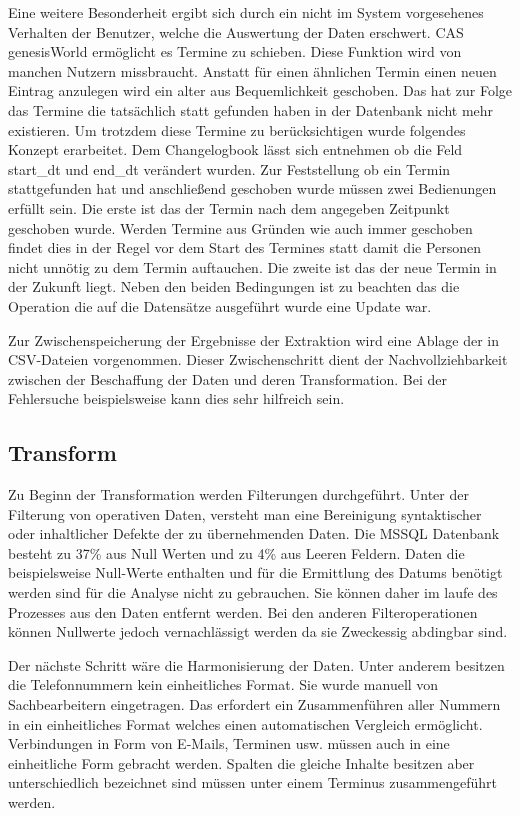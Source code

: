 Eine weitere Besonderheit ergibt sich durch ein nicht im System vorgesehenes Verhalten der Benutzer, welche die Auswertung der Daten erschwert. CAS genesisWorld ermöglicht es Termine zu schieben. Diese Funktion wird von manchen Nutzern missbraucht. Anstatt für einen ähnlichen Termin einen neuen Eintrag anzulegen wird ein alter aus Bequemlichkeit geschoben. Das hat zur Folge das Termine die tatsächlich statt gefunden haben in der Datenbank nicht mehr existieren. Um trotzdem diese Termine zu berücksichtigen wurde folgendes Konzept erarbeitet. Dem Changelogbook lässt sich entnehmen ob die Feld start\_dt und end\_dt verändert wurden. Zur Feststellung ob ein Termin stattgefunden hat und anschließend geschoben wurde müssen zwei Bedienungen erfüllt sein. Die erste ist das der Termin nach dem angegeben Zeitpunkt geschoben wurde. Werden Termine aus Gründen wie auch immer geschoben findet dies in der Regel vor dem Start des Termines statt damit die Personen nicht unnötig zu dem Termin auftauchen. Die zweite ist das der neue Termin in der Zukunft liegt. Neben den beiden Bedingungen ist zu beachten das die Operation die auf die Datensätze ausgeführt wurde eine Update war.

Zur Zwischenspeicherung der Ergebnisse der Extraktion wird eine Ablage der in CSV-Dateien vorgenommen. Dieser Zwischenschritt dient der Nachvollziehbarkeit zwischen der Beschaffung der Daten und deren Transformation. Bei der Fehlersuche beispielsweise kann dies sehr hilfreich sein.  

\subsection{Transform}

Zu Beginn der Transformation werden Filterungen durchgeführt. Unter der Filterung von operativen Daten, versteht man eine Bereinigung syntaktischer oder inhaltlicher Defekte der zu übernehmenden Daten. Die MSSQL Datenbank besteht zu 37\% aus Null Werten und zu 4\% aus Leeren Feldern. Daten die beispielsweise Null-Werte enthalten und für die Ermittlung des Datums benötigt werden sind für die Analyse nicht zu gebrauchen. Sie können daher im laufe des Prozesses aus den Daten entfernt werden. Bei den anderen Filteroperationen können Nullwerte jedoch vernachlässigt werden da sie Zweckessig abdingbar sind.

Der nächste Schritt wäre die Harmonisierung der Daten. Unter anderem besitzen die Telefonnummern kein einheitliches Format. Sie wurde manuell von Sachbearbeitern eingetragen. Das erfordert ein Zusammenführen aller Nummern in ein einheitliches Format welches einen automatischen Vergleich ermöglicht. Verbindungen in Form von E-Mails, Terminen usw. müssen auch in eine einheitliche Form gebracht werden. Spalten die gleiche Inhalte besitzen  aber unterschiedlich bezeichnet sind müssen unter einem Terminus zusammengeführt werden. 

